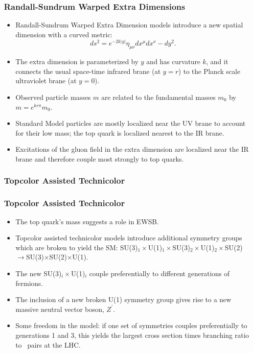 \begin{frame}[noframenumbering, label=rskkg]
\frametitle{Randall-Sundrum Warped Extra Dimensions}
\begin{itemize}
    \item Randall-Sundrum Warped Extra Dimension models introduce a
        new spatial dimension with a curved metric:
\begin{equation*}
    ds^2 = e^{-2k|y|} \eta_{\mu\nu} dx^\mu dx^\nu - dy^2.
\end{equation*}

    \item The extra dimension is parameterized by $y$ and has
        curvature $k$, and it connects the usual space-time infrared
        brane (at $y = r$) to the Planck scale ultraviolet brane (at
        $y = 0$).

    \item Observed particle masses $m$ are related to the fundamental
        masses $m_0$ by $m = e^{kr\pi} m_0$.

    \item Standard Model particles are mostly localized near the UV
        brane to account for their low mass; the top quark is
        localized nearest to the IR brane.

    \item Excitations of the gluon field in the extra dimension are
        localized near the IR brane and therefore couple most strongly
        to top quarks.

\end{itemize}
\end{frame}


\subsubsection*{Topcolor Assisted Technicolor}
\label{topcolor}

\begin{frame}[noframenumbering]
\frametitle{Topcolor Assisted Technicolor}
\begin{center}
\end{center}
\begin{itemize}
    \item The top quark's mass suggests a role in EWSB.
    \item Topcolor assisted technicolor models introduce additional
        symmetry groups which are broken to yield the SM: SU(3)$_1
        \times$U(1)$_1 \times$SU(3)$_2 \times $U(1)$_2
        \times$SU(2)$\to$SU(3)$\times$SU(2)$\times$U(1).
    \item The new SU(3)$_i \times$U(1)$_i$ couple preferentially to
        different generations of fermions.
    \item The inclusion of a new broken U(1) symmetry group gives rise
        to a new massive neutral vector boson, $Z^\prime$.
    \item Some freedom in the model: if one set of symmetries couples
        preferentially to generations 1 and 3, this yields the largest
        cross section times branching ratio to \ttbar\ pairs at the
        LHC.
\end{itemize}
\end{frame}

